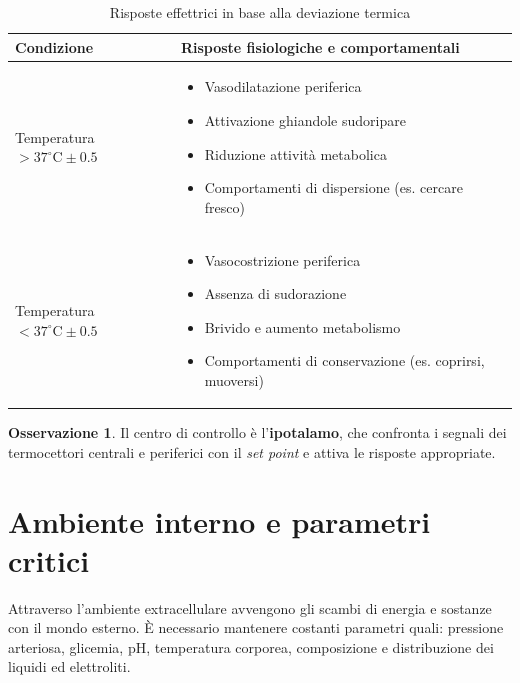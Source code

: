 \documentclass[11pt,a4paper,italian,twoside]{report}
\theoremstyle{definition} %
\newtheorem{remark}{Osservazione}[section]
\begin{document}
\begin{table}[htbp]
  \centering
  \caption{Risposte effettrici in base alla deviazione termica}
  \label{tab:termoregolazione}
  \begin{tabularx}{\textwidth}{l X}
    \toprule
    \textbf{Condizione} & \textbf{Risposte fisiologiche e comportamentali} \\
    \midrule
    Temperatura $> 37^\circ\text{C} \pm 0.5$ & 
    \begin{itemize}[leftmargin=1.5em,noitemsep,topsep=0pt,partopsep=0pt]
      \item Vasodilatazione periferica
      \item Attivazione ghiandole sudoripare
      \item Riduzione attività metabolica
      \item Comportamenti di dispersione (es. cercare fresco)
    \end{itemize} \\
    \addlinespace
    Temperatura $< 37^\circ\text{C} \pm 0.5$ & 
    \begin{itemize}[leftmargin=1.5em,noitemsep,topsep=0pt,partopsep=0pt]
      \item Vasocostrizione periferica
      \item Assenza di sudorazione
      \item Brivido e aumento metabolismo
      \item Comportamenti di conservazione (es. coprirsi, muoversi)
    \end{itemize} \\
    \bottomrule
  \end{tabularx}
\end{table}

\begin{remark}
Il centro di controllo è l'\textbf{ipotalamo}, che confronta i segnali dei termocettori centrali e periferici con il \textit{set point} e attiva le risposte appropriate.
\end{remark}

\section{Ambiente interno e parametri critici}
\label{sec:ambiente_interno}

Attraverso l'ambiente extracellulare avvengono gli scambi di energia e sostanze con il mondo esterno. È necessario mantenere costanti parametri quali: pressione arteriosa, glicemia, pH, temperatura corporea, composizione e distribuzione dei liquidi ed elettroliti.
\end{document}
